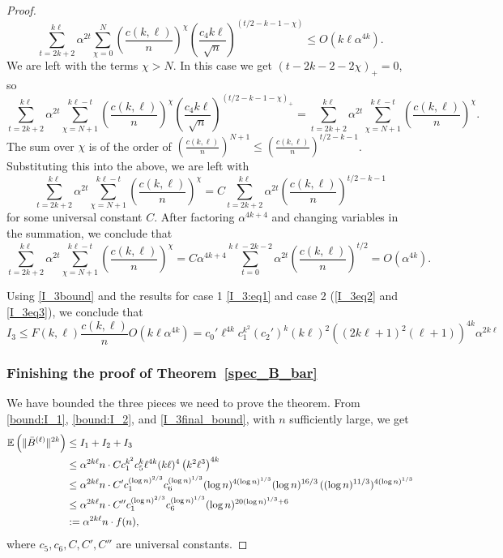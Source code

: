 \begin{proof}
\begin{equation}
\sum_{t=2k+2}^{k\ell} \alpha^{2t}\sum_{\chi=0}^{N} 
\left(\frac{c(k,\ell)}{n}\right)^{\chi} 
\left(\frac{c_4 k\ell}{\sqrt{n}}\right)^{(t/2-k-1-\chi)}
\leq
O(k\ell\alpha^{4k}).
\end{equation}
We are left with the terms $\chi > N$. In this case we get $(t-2k-2-2\chi)_+=0$, so
\[
\sum_{t=2k+2}^{k\ell} \alpha^{2t}\sum_{\chi=N+1}^{k\ell-t}
\left(\frac{c(k,\ell)}{n}\right)^{\chi} 
\left(\frac{c_4 k \ell}{\sqrt{n}}\right)^{(t/2-k-1-\chi)_+}
=
\sum_{t=2k+2}^{k\ell} \alpha^{2t}\sum_{\chi=N+1}^{k\ell-t} \left(\frac{c(k,\ell)}{n}\right)^{\chi}.
\]
The sum over $\chi$ is of the order of $\left(\frac{c(k,\ell)}{n}\right)^{N+1}\leq \left(\frac{c(k,\ell)}{n}\right)^{t/2-k-1}$. 
Substituting this into the above, we are left with
\[
\sum_{t=2k+2}^{k\ell} \alpha^{2t}\sum_{\chi=N+1}^{k\ell-t} \left(\frac{c(k,\ell)}{n}\right)^{\chi}
=
C\sum_{t=2k+2}^{k\ell} \alpha^{2t}\left(\frac{c(k,\ell)}{n}\right)^{t/2-k-1}
\]
for some universal constant $C$. After factoring $\alpha^{4k+4}$ and changing variables in the summation, we conclude that
\begin{equation}\label{I_3eq3}
\sum_{t=2k+2}^{k\ell} \alpha^{2t}\sum_{\chi=N+1}^{k\ell-t} \left(\frac{c(k,\ell)}{n}\right)^{\chi}
=
C\alpha^{4k+4}\sum_{t=0}^{k\ell-2k-2} \alpha^{2t}\left(\frac{c(k,\ell)}{n}\right)^{t/2}
=
O(\alpha^{4k}).
\end{equation}

Using \eqref{I_3bound} and the results for
case 1 \eqref{I_3:eq1} and case 2 (\ref{I_3eq2} and \ref{I_3eq3}),
we conclude that
\begin{equation}\label{I_3final_bound}
I_3\leq F(k,\ell)\frac{c(k,\ell)}{n}O(k\ell \alpha^{4k})
=
c_0'\ell^{4k} 
c_1^{ k^2}
(c_2')^k
(k\ell)^2
((2k\ell + 1)^2 (\ell + 1))^{4k}
\alpha^{2k\ell}
\end{equation}


\subsubsection{Finishing the proof of Theorem~\ref{spec_B_bar}}

We have bounded the three pieces we need to prove the theorem. 
From \eqref{bound:I_1}, \eqref{bound:I_2}, and \eqref{I_3final_bound},
with $n$ sufficiently large, we get
\begin{align*}
\mathbb{E} \left( \| \bar{B}^{(\ell)} \|^{2k}\right)
&\leq 
I_1 + I_2 + I_3  \\
&\leq 
\alpha^{2k\ell}
n
\cdot
C
c_1^{ k^2}
c_5^k
\ell^{4k}
(k \ell)^{4}
\left(k^2\ell^3 \right)^{4k}
\\
&\leq
\alpha^{2k\ell} 
n
\cdot
C'
c_1^{(\log n)^{2/3}}
c_6^{(\log n)^{1/3}}
(\log n)^{4 (\log n)^{1/3}}
(\log n)^{16/3}
\,
((\log n)^{11/3})^{4 (\log n)^{1/3}}
\\
&\leq
\alpha^{2k\ell} 
n
\cdot
C''
c_1^{(\log n)^{2/3}}
c_6^{(\log n)^{1/3}}
(\log n)^{20 (\log n)^{1/3} + 6} 
\\
& := 
\alpha^{2k\ell} n \cdot f(n) ,
\end{align*}
where $c_5, c_6, C, C', C''$ are universal constants.


\end{proof}
